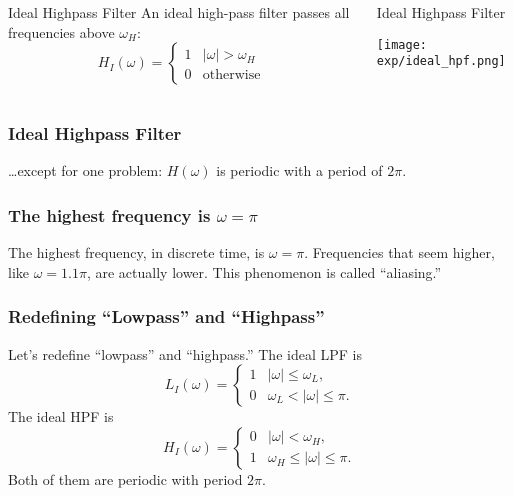 \documentclass{beamer}
\begin{document}
\begin{frame}
  \begin{columns}
    \column{2.25in}
    \begin{block}{Ideal Highpass Filter}
      An ideal high-pass filter passes all frequencies above $\omega_H$:
      \[
      H_I(\omega)
      = \begin{cases} 1& |\omega|>\omega_H\\
        0 & \mbox{otherwise}
      \end{cases}
      \]
    \end{block}
    \column{2.25in}
    \begin{block}{Ideal Highpass Filter}
      \centerline{\texttt{[image: exp/ideal\_hpf.png]}}
    \end{block}
  \end{columns}
\end{frame}

\begin{frame}
  \frametitle{Ideal Highpass Filter}
  \ldots except for one problem: $H(\omega)$ is periodic with a period of $2\pi$.

  \centerline{}  
\end{frame}

\begin{frame}
  \frametitle{The highest frequency is $\omega=\pi$}

  The highest frequency, in discrete time, is $\omega=\pi$.
  Frequencies that seem higher, like $\omega=1.1\pi$, are actually
  lower.  This phenomenon is called ``aliasing.''

  \centerline{}  
\end{frame}

\begin{frame}
  \frametitle{Redefining ``Lowpass'' and ``Highpass''}

  Let's redefine ``lowpass'' and ``highpass.''  The ideal LPF is
  \[
  L_I(\omega)
  = \begin{cases} 1& |\omega|\le\omega_L,\\
    0 & \omega_L<|\omega|\le\pi.
  \end{cases}
  \]
  The ideal HPF is 
  \[
  H_I(\omega)
  = \begin{cases} 0& |\omega|<\omega_H,\\
    1 & \omega_H\le |\omega|\le\pi.
  \end{cases}
  \]
  Both of them are periodic with period $2\pi$.
\end{frame}
\end{document}
